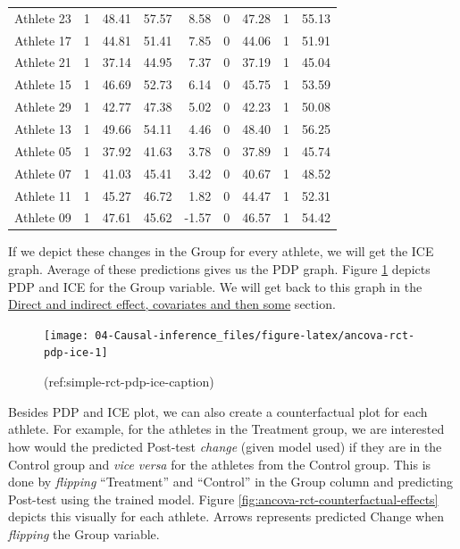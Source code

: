 \documentclass[
]{book}
\begin{document}
\begin{table}
\begin{tabular}[t]{lrrrrrrrr}
\addlinespace
Athlete 23 & 1 & 48.41 & 57.57 & 8.58 & 0 & 47.28 & 1 & 55.13\\
Athlete 17 & 1 & 44.81 & 51.41 & 7.85 & 0 & 44.06 & 1 & 51.91\\
Athlete 21 & 1 & 37.14 & 44.95 & 7.37 & 0 & 37.19 & 1 & 45.04\\
Athlete 15 & 1 & 46.69 & 52.73 & 6.14 & 0 & 45.75 & 1 & 53.59\\
Athlete 29 & 1 & 42.77 & 47.38 & 5.02 & 0 & 42.23 & 1 & 50.08\\
\addlinespace
Athlete 13 & 1 & 49.66 & 54.11 & 4.46 & 0 & 48.40 & 1 & 56.25\\
Athlete 05 & 1 & 37.92 & 41.63 & 3.78 & 0 & 37.89 & 1 & 45.74\\
Athlete 07 & 1 & 41.03 & 45.41 & 3.42 & 0 & 40.67 & 1 & 48.52\\
Athlete 11 & 1 & 45.27 & 46.72 & 1.82 & 0 & 44.47 & 1 & 52.31\\
Athlete 09 & 1 & 47.61 & 45.62 & -1.57 & 0 & 46.57 & 1 & 54.42\\
\bottomrule
\end{tabular}
\end{table}

If we depict these changes in the Group for every athlete, we will get the ICE graph. Average of these predictions gives us the PDP graph. Figure \ref{fig:ancova-rct-pdp-ice} depicts PDP and ICE for the Group variable. We will get back to this graph in the \protect\hyperlink{direct-and-indirect-effect-covariates-and-then-some}{Direct and indirect effect, covariates and then some} section.

\begin{figure}

{\centering \texttt{[image: 04-Causal-inference\_files/figure-latex/ancova-rct-pdp-ice-1]} 

}

\caption{(ref:simple-rct-pdp-ice-caption)}\label{fig:ancova-rct-pdp-ice}
\end{figure}



Besides PDP and ICE plot, we can also create a counterfactual plot for each athlete. For example, for the athletes in the Treatment group, we are interested how would the predicted Post-test \emph{change} (given model used) if they are in the Control group and \emph{vice versa} for the athletes from the Control group. This is done by \emph{flipping} ``Treatment'' and ``Control'' in the Group column and predicting Post-test using the trained model. Figure \ref{fig:ancova-rct-counterfactual-effects} depicts this visually for each athlete. Arrows represents predicted Change when \emph{flipping} the Group variable.
\end{document}
